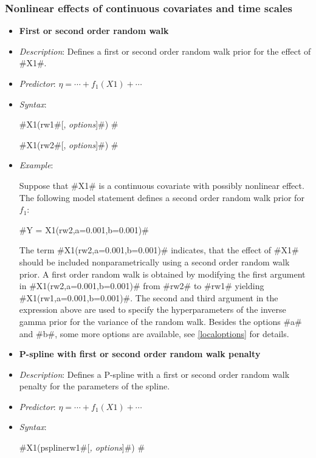 

\subsubsection*{Nonlinear effects of continuous covariates and time
scales}


\begin{itemize}
 \item[]{\bf\sffamily First or second order random walk}
 \item[]{\em Description}: Defines a first or second order random walk
 prior for the effect of #X1#.
 \item[]{\em Predictor}: $\eta = \cdots + f_1(X1) + \cdots $
 \item[] {\em Syntax}:

#X1(rw1#[, {\em options}]#) #

#X1(rw2#[, {\em options}]#) #
\item[] {\em Example}:

Suppose that #X1# is a continuous covariate with possibly
nonlinear effect. The following model statement defines a second
order random walk prior for $f_1$:

#Y = X1(rw2,a=0.001,b=0.001)#

The term #X1(rw2,a=0.001,b=0.001)# indicates, that the effect of
#X1# should be included nonparametrically using a second order
random walk prior. A first order random walk is obtained by
modifying the first argument in #X1(rw2,a=0.001,b=0.001)# from
#rw2# to #rw1# yielding #X1(rw1,a=0.001,b=0.001)#. The second and
third argument in the expression above are used to specify the
hyperparameters of the inverse gamma prior for the variance of the
random walk. Besides the options #a# and #b#, some more options
are available, see \autoref{localoptions} for details.

\item[] {\bf\sffamily P-spline with first or second order random
walk penalty}

\item[] {\em Description}: Defines a P-spline with a first or
second order random walk penalty for the parameters of the spline.
\item[] {\em Predictor}: $\eta =  \cdots + f_1(X1) + \cdots$
\item[] {\em Syntax}:

#X1(psplinerw1#[{\em , options}]#) #


\end{itemize}
